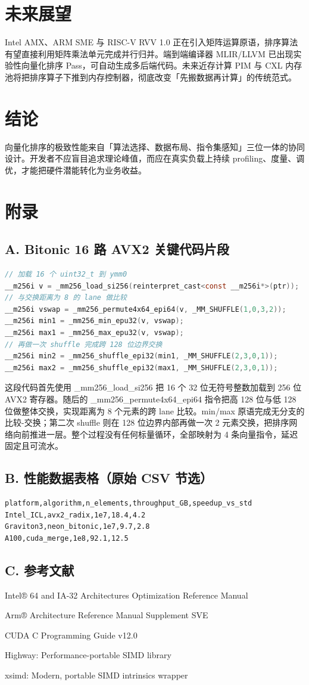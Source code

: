 \chapter{未来展望}
Intel AMX、ARM SME 与 RISC-V RVV 1.0 正在引入矩阵运算原语，排序算法有望直接利用矩阵乘法单元完成并行归并。端到端编译器 MLIR/LLVM 已出现实验性向量化排序 Pass，可自动生成多后端代码。未来近存计算 PIM 与 CXL 内存池将把排序算子下推到内存控制器，彻底改变「先搬数据再计算」的传统范式。\par
\chapter{结论}
向量化排序的极致性能来自「算法选择、数据布局、指令集感知」三位一体的协同设计。开发者不应盲目追求理论峰值，而应在真实负载上持续 profiling、度量、调优，才能把硬件潜能转化为业务收益。\par
\chapter{附录}
\section{A. Bitonic 16 路 AVX2 关键代码片段}
\begin{lstlisting}[language=c]
// 加载 16 个 uint32_t 到 ymm0
__m256i v = _mm256_load_si256(reinterpret_cast<const __m256i*>(ptr));
// 与交换距离为 8 的 lane 做比较
__m256i vswap = _mm256_permute4x64_epi64(v, _MM_SHUFFLE(1,0,3,2));
__m256i min1 = _mm256_min_epu32(v, vswap);
__m256i max1 = _mm256_max_epu32(v, vswap);
// 再做一次 shuffle 完成跨 128 位边界交换
__m256i min2 = _mm256_shuffle_epi32(min1, _MM_SHUFFLE(2,3,0,1));
__m256i max2 = _mm256_shuffle_epi32(max1, _MM_SHUFFLE(2,3,0,1));
\end{lstlisting}
这段代码首先使用 \_{}mm256\_{}load\_{}si256 把 16 个 32 位无符号整数加载到 256 位 AVX2 寄存器。随后的 \_{}mm256\_{}permute4x64\_{}epi64 指令把高 128 位与低 128 位做整体交换，实现距离为 8 个元素的跨 lane 比较。min/max 原语完成无分支的比较-交换；第二次 shuffle 则在 128 位边界内部再做一次 2 元素交换，把排序网络向前推进一层。整个过程没有任何标量循环，全部映射为 4 条向量指令，延迟固定且可流水。\par
\section{B. 性能数据表格（原始 CSV 节选）}
\begin{lstlisting}
platform,algorithm,n_elements,throughput_GB,speedup_vs_std
Intel_ICL,avx2_radix,1e7,18.4,4.2
Graviton3,neon_bitonic,1e7,9.7,2.8
A100,cuda_merge,1e8,92.1,12.5
\end{lstlisting}
\section{C. 参考文献}
Intel® 64 and IA-32 Architectures Optimization Reference Manual\par
Arm® Architecture Reference Manual Supplement SVE\par
CUDA C Programming Guide v12.0\par
Highway: Performance-portable SIMD library\par
xsimd: Modern, portable SIMD intrinsics wrapper\par

